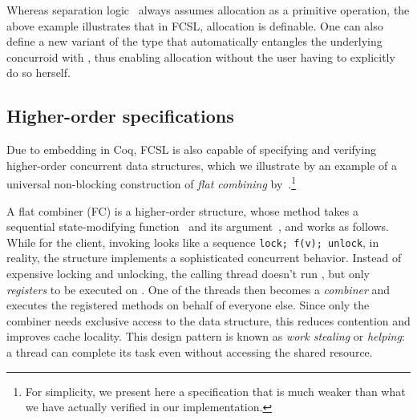 Whereas separation logic~\cite{Reynolds:LICS02} always assumes
allocation as a primitive operation, the above example illustrates
that in FCSL, allocation is definable. One can also define a new
variant of the  type that automatically entangles the
underlying concurroid with , thus enabling allocation
without the user having to explicitly do so herself.

\subsection{Higher-order specifications}
\label{sec:high-order-spec}

Due to embedding in Coq, FCSL is also capable of specifying and
verifying higher-order concurrent data structures, which we illustrate
by an example of a universal non-blocking construction of \emph{flat
  combining} by~\citet{Hendler-al:SPAA10}.\footnote{For simplicity, we
  present here a specification that is much weaker than what we have
  actually verified in our implementation.}

A flat combiner (FC) is a higher-order structure, whose method
 takes a sequential state-modifying
function~ and its argument~, and works as
follows. While for the client, invoking  looks
like a sequence \texttt{\small{lock; f(v); unlock}}, in reality, the
structure implements a sophisticated concurrent
behavior. Instead of expensive locking and unlocking, the calling
thread doesn't run , but only \emph{registers}  to be
executed on . One of the threads then becomes a
\emph{combiner} and executes the registered methods on behalf of
everyone else. Since only the combiner needs exclusive access to the
data structure, this reduces contention and improves cache
locality. This design pattern is known as \emph{work stealing} or
\emph{helping}: a thread can complete its task even without accessing
the shared resource.

